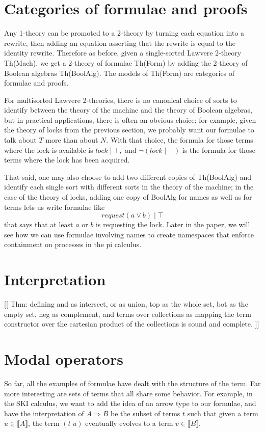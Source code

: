 \documentclass{article}
\newcommand{\interp}[1]{\llbracket #1 \rrbracket}
\newcommand{\lhom}{\Rightarrow}
\begin{document}
\section{Categories of formulae and proofs}

Any 1-theory can be promoted to a 2-theory by turning each equation into a rewrite, then adding an equation asserting that the rewrite is equal to the identity rewrite.  Therefore as before, given a single-sorted Lawvere 2-theory Th(Mach), we get a 2-theory of formulae Th(Form) by adding the 2-theory of Boolean algebras Th(BoolAlg).  The models of Th(Form) are categories of formulae and proofs.

For multisorted Lawvere 2-theories, there is no canonical choice of sorts to identify between the theory of the machine and the theory of Boolean algebras, but in practical applications, there is often an obvious choice; for example, given the theory of locks from the previous section, we probably want our formulae to talk about $T$ more than about $N$.  With that choice, the formula for those terms where the lock is available is $lock\;|\;\top,$ and $\neg(lock \;|\;\top)$ is the formula for those terms where the lock has been acquired.

That said, one may also choose to add two different copies of Th(BoolAlg) and identify each single sort with different sorts in the theory of the machine; in the case of the theory of locks, adding one copy of BoolAlg for names as well as for terms lets us write formulae like
\[ request({a}\lor{b}) \;|\; \top \]
that says that at least $a$ or $b$ is requesting the lock.  Later in the paper, we will see how we can use formulae involving names to create namespaces that enforce containment on processes in the pi calculus.

\section{Interpretation}

[[ Thm: defining and as intersect, or as union, top as the whole set, bot as the empty set, neg as complement, and terms over collections as mapping the term constructor over the cartesian product of the collections is sound and complete. ]]

\section{Modal operators}

So far, all the examples of formulae have dealt with the structure of the term.  Far more interesting are sets of terms that all share some behavior.  For example, in the SKI calculus, we want to add the idea of an arrow type to our formulae, and have the interpretation of $A \lhom B$ be the subset of terms $t$ such that given a term $u\in\interp{A}$, the term $(t\; u)$ eventually evolves to a term $v\in\interp{B}.$
\end{document}
